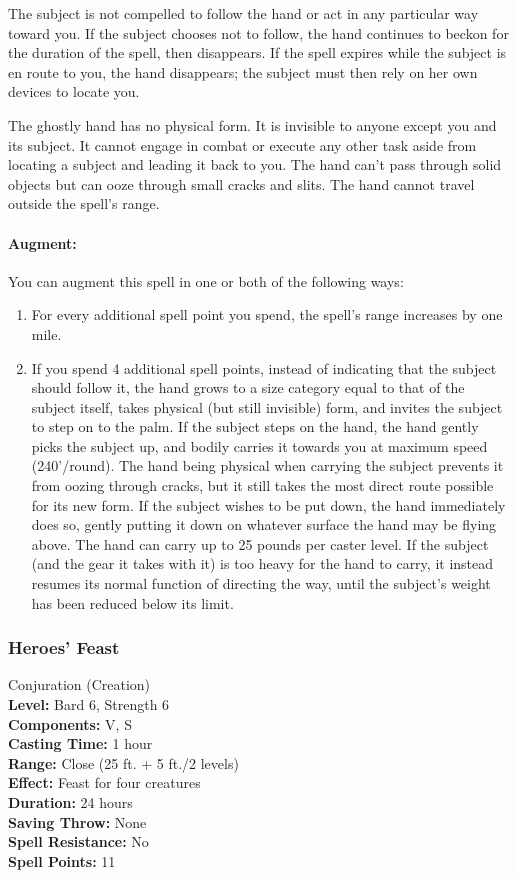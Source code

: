 The subject is not compelled to follow the hand or act in any particular way toward you. 
If the subject chooses not to follow, the hand continues to beckon for the duration of the spell, then disappears. 
If the spell expires while the subject is en route to you, the hand disappears; the subject must then rely on her own devices to locate you.

The ghostly hand has no physical form. 
It is invisible to anyone except you and its subject. 
It cannot engage in combat or execute any other task aside from locating a subject and leading it back to you. 
The hand can't pass through solid objects but can ooze through small cracks and slits. 
The hand cannot travel outside the spell's range.

\paragraph{Augment:} You can augment this spell in one or both of the following ways:
\begin{enumerate}
 \item For every additional spell point you spend, the spell's range increases by one mile.
 \item If you spend 4 additional spell points, instead of indicating that the subject should follow it, the hand grows to a size category equal to that of the subject itself, takes physical (but still invisible) form, and invites the subject to step on to the palm. If the subject steps on the hand, the hand gently picks the subject up, and bodily carries it towards you at maximum speed (240'/round).
 The hand being physical when carrying the subject prevents it from oozing through cracks, but it still takes the most direct route possible for its new form.
 If the subject wishes to be put down, the hand immediately does so, gently putting it down on whatever surface the hand may be flying above.
 The hand can carry up to 25 pounds per caster level. If the subject (and the gear it takes with it) is too heavy for the hand to carry, it instead resumes its normal function of directing the way, until the subject's weight has been reduced below its limit.
\end{enumerate}

\subsubsection{Heroes' Feast}
\label{Spell:HeroesFeast}
Conjuration (Creation)
\\ \textbf{Level:} Bard 6, Strength 6
\\ \textbf{Components:} V, S
\\ \textbf{Casting Time:} 1 hour
\\ \textbf{Range:} Close (25 ft. + 5 ft./2 levels)
\\ \textbf{Effect:} Feast for four creatures
\\ \textbf{Duration:} 24 hours
\\ \textbf{Saving Throw:} None
\\ \textbf{Spell Resistance:} No
\\ \textbf{Spell Points:} 11

